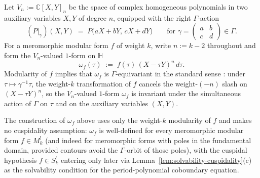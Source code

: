 \documentclass[11pt]{article}
\numberwithin{equation}{section}  %
\newcommand{\HH}{\mathbb{H}}
\newcommand{\CC}{\mathbb{C}}
\begin{document}
Let $V_n := \CC[X, Y]_n$ be the space of complex homogeneous polynomials
in two auxiliary variables $X, Y$ of degree $n$, equipped with the
right $\Gamma$-action
\begin{equation}
  (P|_\gamma)(X, Y) \;=\; P\bigl(aX + bY,\, cX + dY\bigr)
  \qquad
  \text{for } \gamma = \begin{pmatrix}a & b\\ c & d\end{pmatrix} \in \Gamma.
\end{equation}
For a meromorphic modular form $f$ of weight $k$, write $n := k - 2$
throughout and form the $V_n$-valued $1$-form on $\HH$
\begin{equation}
  \omega_f(\tau) \;:=\; f(\tau)\,(X - \tau Y)^n\,d\tau.
\end{equation}
Modularity of $f$ implies that $\omega_f$ is $\Gamma$-equivariant in
the standard sense \cite{KZ1984}: under $\tau \mapsto \gamma^{-1}\tau$,
the weight-$k$ transformation of $f$ cancels the weight-$(-n)$ slash
on $(X - \tau Y)^n$, so the $V_n$-valued $1$-form $\omega_f$ is
invariant under the simultaneous action of $\Gamma$ on $\tau$ and on
the auxiliary variables $(X, Y)$.  %

The construction of $\omega_f$ above uses only the weight-$k$ modularity
of $f$ and makes no cuspidality assumption: $\omega_f$ is well-defined
for every meromorphic modular form $f \in M^!_k$ (and indeed for
meromorphic forms with poles in the fundamental domain, provided
contours avoid the $\Gamma$-orbit of those poles), with the cuspidal
hypothesis $f \in S^!_k$ entering only later via
Lemma~\ref{lem:solvability-cuspidality}(c) as the solvability
condition for the period-polynomial coboundary equation.
\end{document}
